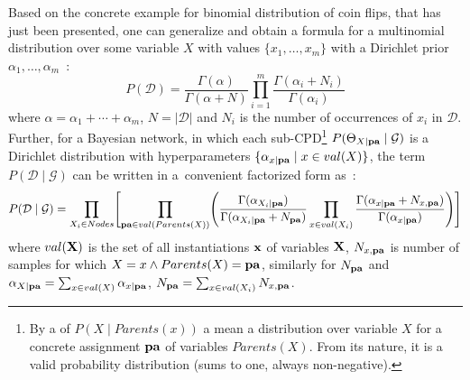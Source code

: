 \documentclass[english,cover]{fitthesis} %
\newcommand{\vars}[1]{{\bold{#1}}}         %
\begin{document}
Based on the concrete example for binomial distribution of coin flips, that has just been presented, one can generalize and obtain a formula for a multinomial distribution over some variable $X$ with values $\lbrace x_1, \dots, x_m \rbrace$ with a Dirichlet prior $\alpha_1, \dots, \alpha_m$~\cite[p.~798]{pgm}:
\begin{equation}\label{eq:bayesian_score_multinomial}
    P(\mathcal{D})
      = \frac{\Gamma(\alpha)}{\Gamma(\alpha + N)}
        \prod_{i=1}^m
        \frac{\Gamma(\alpha_i + N_i)}{\Gamma(\alpha_i)}
\end{equation}
where $\alpha = \alpha_1 + \dotsm + \alpha_m$, $N = | \mathcal{D}|$ and $N_i$ is the number of occurrences of $x_i$ in $\mathcal{D}$. Further, for a Bayesian network, in which each sub-CPD\footnote{By a  of $P(X \mid Parents(x))$ a mean a distribution over variable $X$ for a concrete assignment $\vars{pa}$ of variables $Parents(X)$. From its nature, it is a valid probability distribution (sums to one, always non-negative).} $P(\Theta_{X \mid \vars{pa}} \mid \mathcal{G})$ is a Dirichlet distribution with hyperparameters $\lbrace \alpha_{x \mid \vars{pa}} \mid x \in val(X)\rbrace$, the term $P(\mathcal{D} \mid \mathcal{G})$ can be written in a~convenient factorized form as~\cite[p.~801]{pgm}:
\begin{equation}\label{eq:bayesian_score_for_bn}
    P(\mathcal{D} \mid \mathcal{G})
      = \prod_{X_i \in Nodes}
             \Biggl[
                \prod_{\vars{pa} \in val(Parents(X))}
                   \Biggl(
                      \frac{\Gamma(\alpha_{X_i \mid \vars{pa}})}{\Gamma(\alpha_{X_i \mid \vars{pa}} + N_{\vars{pa}})}
                      \prod_{x \in val(X_i)} \frac{\Gamma(\alpha_{x \mid \vars{pa}} + N_{x, \vars{pa}})}{\Gamma(\alpha_{x \mid \vars{pa}})}
                   \Biggr)
             \Biggr]
\end{equation}
where $val(\vars{X})$ is the set of all instantiations $\vars{x}$ of variables $\vars{X}$, $N_{x,\vars{pa}}$ is number of samples for which $X = x \land Parents(X) = \vars{pa}$, similarly for $N_\vars{pa}$ and $\alpha_{X \mid \vars{pa}} = \sum_{x \in val(X)} \alpha_{x \mid \vars{pa}}$, $N_\vars{pa} = \sum_{x \in val(X_i)} N_{x,\vars{pa}}$.
\end{document}
